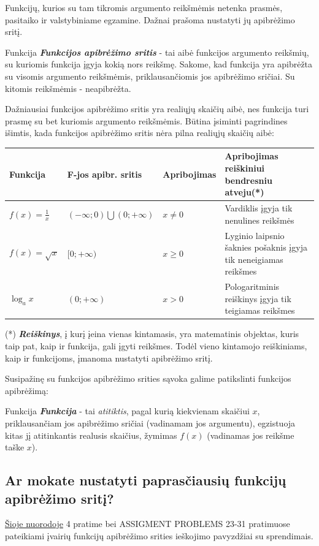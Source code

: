 \documentclass{article}
\begin{document}
Funkcijų, kurios su tam tikromis argumento reikšmėmis netenka prasmės, pasitaiko ir valstybiniame egzamine. Dažnai prašoma nustatyti jų apibrėžimo sritį. 
\begin{mybox}{Funkcija}
\textbf{\textit{Funkcijos apibrėžimo sritis}} - tai aibė funkcijos argumento reikšmių, su kuriomis funkcija įgyja kokią nors reikšmę. Sakome, kad funkcija yra apibrėžta su visomis argumento reikšmėmis, priklausančiomis jos apibrėžimo sričiai. Su kitomis reikšmėmis - neapibrėžta.
\end{mybox}
Dažniausiai funkcijos apibrėžimo sritis yra realiųjų skaičių aibė, nes funkcija turi prasmę su bet kuriomis argumento reikšmėmis. Būtina įsiminti pagrindines išimtis, kada funkcijos apibrėžimo sritis nėra pilna realiųjų skaičių aibė:

\begin{tabular}{|l|l|l|l|}
\hline
Funkcija & F-jos apibr. sritis & Apribojimas & Apribojimas reiškiniui bendresniu atveju(*)\\
\hline
$f(x)=\frac{1}{x}$ & $(-\infty; 0)\bigcup (0;+\infty)$ & $x\neq 0$ & Vardiklis įgyja tik nenulines reikšmės \\
\hline
$f(x)=\sqrt{x}$ & $[0;+\infty)$ & $x\ge 0$ & Lyginio laipsnio šaknies pošaknis įgyja tik neneigiamas reikšmes\\
\hline
$\log_{a}x$ & $(0;+\infty)$ & $x>0$ & Pologaritminis reiškinys įgyja tik teigiamas reikšmes\\
\hline
\end{tabular}

(*) \textbf{\textit{Reiškinys}}, į kurį įeina vienas kintamasis, yra matematinis objektas, kuris taip pat, kaip ir funkcija, gali įgyti reikšmes. Todėl vieno kintamojo reiškiniams, kaip ir funkcijoms, įmanoma nustatyti apibrėžimo sritį.

Susipažinę su funkcijos apibrėžimo srities sąvoka galime patikslinti funkcijos apibrėžimą:

\begin{mybox}{Funkcija}
\textbf{\textit{Funkcija}} - tai \textit{atitiktis}, pagal kurią kiekvienam skaičiui $x$, priklausančiam jos apibrėžimo sričiai (vadinamam jos argumentu), egzistuoja kitas jį atitinkantis realusis skaičius, žymimas $f(x)$ (vadinamas jos reikšme taške $x$).
\end{mybox}
\subsection*{Ar mokate nustatyti paprasčiausių funkcijų apibrėžimo sritį?}
\href{http://tutorial.math.lamar.edu/Classes/CalcI/Functions.aspx}{Šioje nuorodoje} 4 pratime bei ASSIGMENT PROBLEMS 23-31 pratimuose pateikiami įvairių funkcijų apibrėžimo srities ieškojimo pavyzdžiai su sprendimais. 
\end{document}
